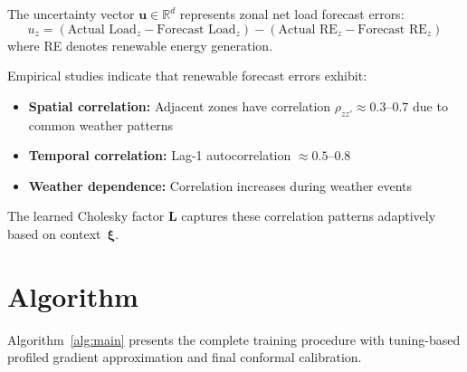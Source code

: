 \documentclass[lettersize,journal]{IEEEtran}
\newcommand{\R}{\mathbb{R}}
\newcommand{\bu}{\bm{u}}
\newcommand{\bxi}{\bm{\xi}}
\newcommand{\bL}{\bm{L}}
\theoremstyle{definition}
\begin{document}
The uncertainty vector $\bu \in \R^d$ represents zonal net load forecast errors:
\begin{equation}
u_z = (\text{Actual Load}_z - \text{Forecast Load}_z) - (\text{Actual RE}_z - \text{Forecast RE}_z)
\end{equation}
where RE denotes renewable energy generation.

Empirical studies indicate that renewable forecast errors exhibit:
\begin{itemize}
\item \textbf{Spatial correlation:} Adjacent zones have correlation $\rho_{zz'} \approx 0.3$--$0.7$ due to common weather patterns
\item \textbf{Temporal correlation:} Lag-1 autocorrelation $\approx 0.5$--$0.8$
\item \textbf{Weather dependence:} Correlation increases during weather events
\end{itemize}

The learned Cholesky factor $\bL$ captures these correlation patterns adaptively based on context~$\bxi$.

\section{Algorithm}
\label{sec:algorithm}

Algorithm~\ref{alg:main} presents the complete training procedure with tuning-based profiled gradient approximation and final conformal calibration.
\end{document}
